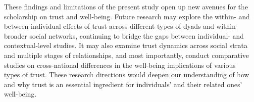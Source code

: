 These findings and limitations of the present study open up new avenues for the scholarship on trust and well-being. Future research may explore the within- and between-individual effects of trust across different types of dyads and within broader social networks, continuing to bridge the gaps between individual- and contextual-level studies. It may also examine trust dynamics across social strata and multiple stages of relationships, and most importantly, conduct comparative studies on cross-national differences in the well-being implications of various types of trust. These research directions would deepen our understanding of how and why trust is an essential ingredient for individuals' and their related ones' well-being.
